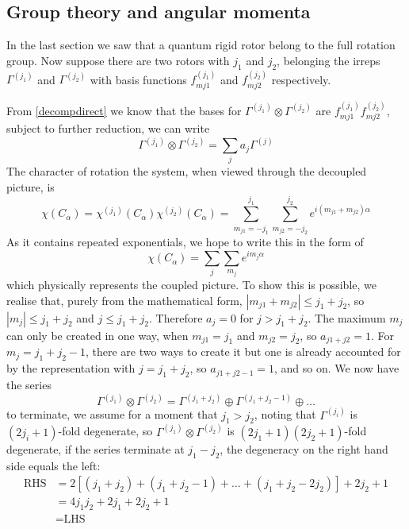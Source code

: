 \subsection{Group theory and angular momenta}
In the last section we saw that a quantum rigid rotor belong to the full rotation group. Now suppose there are two rotors with $j_1$ and $j_2$, belonging the irreps $\Gamma^{(j_1)}$ and $\Gamma^{(j_2)} $ with basis functions $f_{mj1}^{(j_1)} $ and $f_{mj2}^{(j_2)} $ respectively.\par
From \cref{decompdirect} we know that the bases for $\Gamma^{(j_1)}\otimes \Gamma^{(j_2)}$ are $f_{mj1}^{(j_1)}f_{mj2}^{(j_2)}$, subject to further reduction, we can write
\begin{equation}
	\Gamma^{(j_1)}\otimes \Gamma^{(j_2)}=\sum_ja_j\Gamma^{(j)}
\end{equation}
The character of rotation the system, when viewed through the decoupled picture, is 
\begin{equation}
	\chi(C_{\alpha})=\chi^{(j_1)}(C_{\alpha})\chi^{(j_2)}(C_{\alpha})=\sum_{m_{j1}=-j_1}^{j_1}\sum_{m_{j2}=-j_2}^{j_2}e^{i(m_{j1}+m_{j2})\alpha}
\end{equation}
As it contains repeated exponentials, we hope to write this in the form of
\begin{equation}
	\chi(C_{\alpha})=\sum_j\sum_{m_j}e^{im_j\alpha}
\end{equation}
which physically represents the coupled picture. To show this is possible, we realise that, purely from the mathematical form, $|m_{j1}+m_{j2}|\leq j_1+j_2$, so $|m_j|\leq j_1+j_2$ and $j\leq j_1+j_2$. Therefore $a_j=0$ for $j>j_1+j_2$. The maximum $m_j$ can only be created in one way, when $m_{j1}=j_1$ and $m_{j2}=j_2$, so $a_{j1+j2}=1$. For $m_j=j_1+j_2-1$, there are two ways to create it but one is already accounted for by the representation with $j=j_1+j_2$, so $a_{j1+j2-1}=1$, and so on. We now have the series 
\begin{equation}
	\Gamma^{(j_1)}\otimes\Gamma^{(j_2)}=\Gamma^{(j_1+j_2)}\oplus\Gamma^{(j_1+j_2-1)}\oplus\dots
\end{equation}
to terminate, we assume for a moment that $j_1>j_2$, noting that $\Gamma^{(j_i)} $ is $(2j_i+1)$-fold degenerate, so $\Gamma^{(j_1)}\otimes \Gamma^{(j_2)}$ is $(2j_1+1)(2j_2+1)$-fold degenerate, if the series terminate at $j_1-j_2$, the degeneracy on the right hand side equals the left:
\begin{equation}
\begin{aligned}
	\text{RHS}&=2[(j_1+j_2)+(j_1+j_2-1)+\dots+(j_1+j_2-2j_2)] +2j_2+1\\
	&=4j_1j_2+2j_1+2j_2+1\\
	&=\text{LHS}
\end{aligned}
\end{equation}
